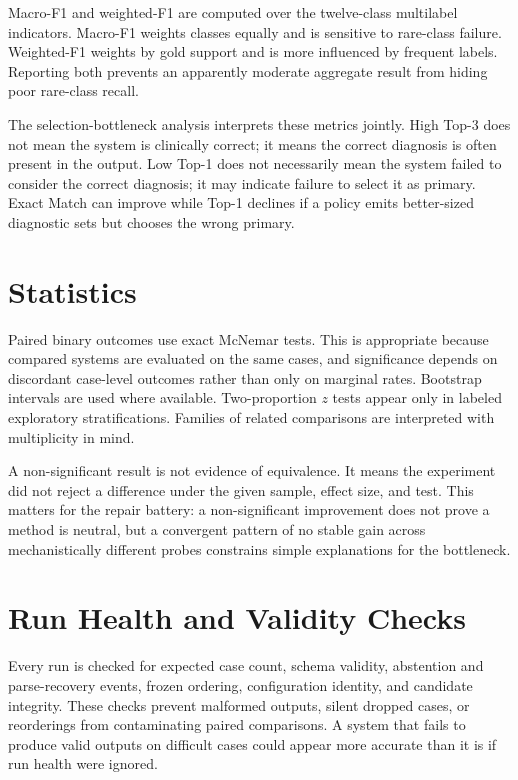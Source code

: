 Macro-F1 and weighted-F1 are computed over the twelve-class multilabel indicators. Macro-F1 weights classes equally and is sensitive to rare-class failure. Weighted-F1 weights by gold support and is more influenced by frequent labels. Reporting both prevents an apparently moderate aggregate result from hiding poor rare-class recall.

The selection-bottleneck analysis interprets these metrics jointly. High Top-3 does not mean the system is clinically correct; it means the correct diagnosis is often present in the output. Low Top-1 does not necessarily mean the system failed to consider the correct diagnosis; it may indicate failure to select it as primary. Exact Match can improve while Top-1 declines if a policy emits better-sized diagnostic sets but chooses the wrong primary.

\section{Statistics}

Paired binary outcomes use exact McNemar tests. This is appropriate because compared systems are evaluated on the same cases, and significance depends on discordant case-level outcomes rather than only on marginal rates. Bootstrap intervals are used where available. Two-proportion $z$ tests appear only in labeled exploratory stratifications. Families of related comparisons are interpreted with multiplicity in mind.

A non-significant result is not evidence of equivalence. It means the experiment did not reject a difference under the given sample, effect size, and test. This matters for the repair battery: a non-significant improvement does not prove a method is neutral, but a convergent pattern of no stable gain across mechanistically different probes constrains simple explanations for the bottleneck.

\section{Run Health and Validity Checks}

Every run is checked for expected case count, schema validity, abstention and parse-recovery events, frozen ordering, configuration identity, and candidate integrity. These checks prevent malformed outputs, silent dropped cases, or reorderings from contaminating paired comparisons. A system that fails to produce valid outputs on difficult cases could appear more accurate than it is if run health were ignored.

